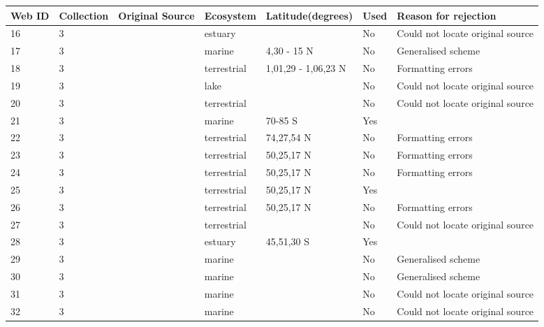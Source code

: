 \documentclass[12pt]{article}
\begin{document}
\begin{landscape}
    \begin{table}[h!]
    \centering
    {\footnotesize
      \begin{tabular}{p{2.8cm}p{1.3cm}p{3cm}p{2.2cm}p{2.5cm}lp{8.2cm}}
        \hline
        Web ID & Collection & Original Source & Ecosystem & Latitude(degrees) & Used  & Reason for rejection  \\
        \hline
        16    & 3 & \cite{Copeland1974}    & estuary &       & No    & Could not locate original source \\
        17    & 3 & \cite{Hiatt1960}  & marine & 4,30 - 15 N & No    & Generalised scheme \\
        18    & 3 & \cite{Niering1963a}  & terrestrial & 1,01,29 - 1,06,23 N & No   &  Formatting errors     \\
        19    & 3 & \cite{Brooks1963}    & lake &       & No    & Could not locate original source \\
        20    & 3 & \cite{Knox1970}  & terrestrial &       & No    & Could not locate original source \\
        21    & 3 & \cite{Patten1979}  & marine & 70-85 S & Yes   &       \\
        22    & 3 & \cite{Summerhayes1923}  & terrestrial & 74,27,54 N & No   &  Formatting errors     \\
        23    & 3 & \cite{Bird1930}  & terrestrial & 50,25,17 N & No  &  Formatting errors       \\
        24    & 3 & \cite{Bird1930}  & terrestrial & 50,25,17 N & No  &  Formatting errors     \\
        25    & 3 & \cite{Bird1930}  & terrestrial & 50,25,17 N & Yes   &       \\
        26    & 3 & \cite{Bird1930}  & terrestrial & 50,25,17 N & No  &  Formatting errors     \\
        27    & 3 & \cite{Varley1970}  & terrestrial &       & No    & Could not locate original source \\
        28    & 3 & \cite{Paviour-Smith1956}  & estuary & 45,51,30 S & Yes   &       \\
        29    & 3 & \cite{Dunbar1953}  & marine &       & No    & Generalised scheme \\
        30    & 3 & \cite{Mackintosh1964}  & marine &       & No    & Generalised scheme \\
        31    & 3 & \cite{Petipa1970}  & marine &       & No    & Could not locate original source \\
        32    & 3 & \cite{Petipa1970}  & marine &       & No    & Could not locate original source \\

\end{tabular}}
\end{table}
\end{landscape}
\end{document}
